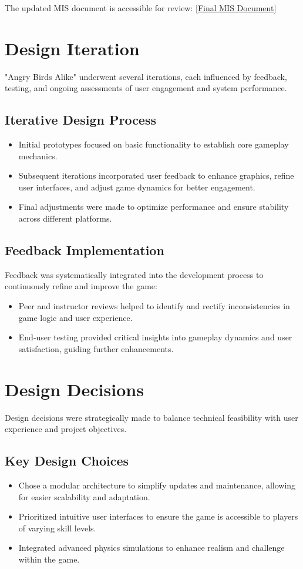 \documentclass[12pt]{article}
\begin{document}
The updated MIS document is accessible for review:
[\href{https://github.com/XessX/Angry_Bird_Alike/blob/main/docs/Design/SoftDetailedDes/MIS.pdf}{Final MIS Document}]

\section{Design Iteration}
"Angry Birds Alike" underwent several iterations, each influenced by feedback, testing, and ongoing assessments of user engagement and system performance.

\subsection{Iterative Design Process}
\begin{itemize}
    \item Initial prototypes focused on basic functionality to establish core gameplay mechanics.
    \item Subsequent iterations incorporated user feedback to enhance graphics, refine user interfaces, and adjust game dynamics for better engagement.
    \item Final adjustments were made to optimize performance and ensure stability across different platforms.
\end{itemize}

\subsection{Feedback Implementation}
Feedback was systematically integrated into the development process to continuously refine and improve the game:
\begin{itemize}
    \item Peer and instructor reviews helped to identify and rectify inconsistencies in game logic and user experience.
    \item End-user testing provided critical insights into gameplay dynamics and user satisfaction, guiding further enhancements.
\end{itemize}

\section{Design Decisions}
Design decisions were strategically made to balance technical feasibility with user experience and project objectives.

\subsection{Key Design Choices}
\begin{itemize}
    \item Chose a modular architecture to simplify updates and maintenance, allowing for easier scalability and adaptation.
    \item Prioritized intuitive user interfaces to ensure the game is accessible to players of varying skill levels.
    \item Integrated advanced physics simulations to enhance realism and challenge within the game.
\end{itemize}
\end{document}
